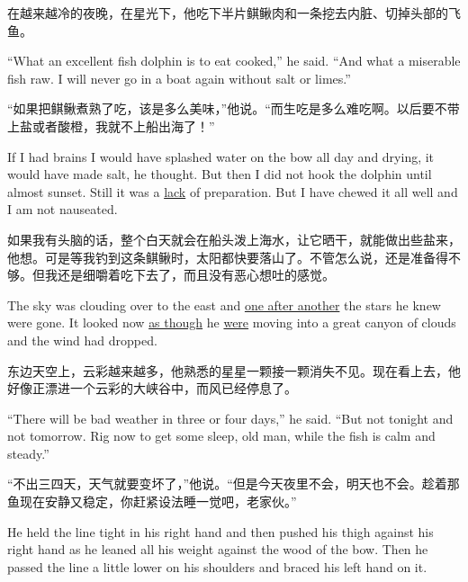 \begin{paracol}{2}
\switchcolumn

在越来越冷的夜晚，在星光下，他吃下半片鲯鳅肉和一条挖去内脏、切掉头部的飞鱼。

\switchcolumn*

``What an excellent fish dolphin is to eat cooked,'' he said. ``And what a
\gls{miserable} fish raw. I will never go in a boat again without salt or
limes.''

\switchcolumn

“如果把鲯鳅煮熟了吃，该是多么美味，”他说。“而生吃是多么难吃啊。以后要不带上盐或者酸橙，我就不上船出海了！”

\switchcolumn*

If I had brains I would have \gls{splashed} water on the bow all day and
drying, it would have made salt, he thought. But then I did not hook the
dolphin until almost sunset. Still it was a \uline{lack} of
\gls{preparation}. But I have chewed it all well and I am not
\gls{nauseated}.

\switchcolumn

如果我有头脑的话，整个白天就会在船头泼上海水，让它晒干，就能做出些盐来，他想。可是等我钓到这条鲯鳅时，太阳都快要落山了。不管怎么说，还是准备得不够。但我还是细嚼着吃下去了，而且没有恶心想吐的感觉。

\switchcolumn*

The sky was clouding over to the east and \uline{one after another} the
stars he knew were gone. It looked now \uline{as though} he \uline{were}
moving into a great \gls{canyon} of clouds and the wind had dropped.

\switchcolumn

东边天空上，云彩越来越多，他熟悉的星星一颗接一颗消失不见。现在看上去，他好像正漂进一个云彩的大峡谷中，而风已经停息了。

\switchcolumn*

``There will be bad weather in three or four days,'' he said. ``But not
tonight and not tomorrow. Rig now to get some sleep, old man, while the fish
is calm and steady.''

\switchcolumn

“不出三四天，天气就要变坏了，”他说。“但是今天夜里不会，明天也不会。趁着那鱼现在安静又稳定，你赶紧设法睡一觉吧，老家伙。”

\switchcolumn*

He held the line tight in his right hand and then pushed his thigh against
his right hand as he leaned all his weight against the wood of the bow. Then
he passed the line a little lower on his shoulders and braced his left hand
on it.


\end{paracol}
